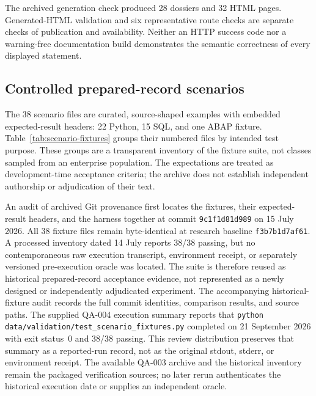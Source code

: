 \documentclass[a4paper,fleqn]{cas-dc}
\begin{document}
The archived generation check produced 28 dossiers and 32 HTML pages. Generated-HTML validation and six representative route checks are separate checks of publication and availability. Neither an HTTP success code nor a warning-free documentation build demonstrates the semantic correctness of every displayed statement.

\subsection{Controlled prepared-record scenarios}
\label{sec:scenario-fixtures}

The 38 scenario files are curated, source-shaped examples with embedded expected-result headers: 22 Python, 15 SQL, and one ABAP fixture. Table~\ref{tab:scenario-fixtures} groups their numbered files by intended test purpose. These groups are a transparent inventory of the fixture suite, not classes sampled from an enterprise population. The expectations are treated as development-time acceptance criteria; the archive does not establish independent authorship or adjudication of their text.

An audit of archived Git provenance first locates the fixtures, their expected-result headers, and the harness together at commit \texttt{9c1f1d81d989} on 15 July 2026. All 38 fixture files remain byte-identical at research baseline \texttt{f3b7b1d7af61}. A processed inventory dated 14 July reports 38/38 passing, but no contemporaneous raw execution transcript, environment receipt, or separately versioned pre-execution oracle was located. The suite is therefore reused as historical prepared-record acceptance evidence, not represented as a newly designed or independently adjudicated experiment. The accompanying historical-fixture audit records the full commit identities, comparison results, and source paths. The supplied QA-004 execution summary reports that \texttt{python data/validation/test\_scenario\_fixtures.py} completed on 21 September 2026 with exit status~0 and 38/38 passing. This review distribution preserves that summary as a reported-run record, not as the original stdout, stderr, or environment receipt. The available QA-003 archive and the historical inventory remain the packaged verification sources; no later rerun authenticates the historical execution date or supplies an independent oracle.
\end{document}
